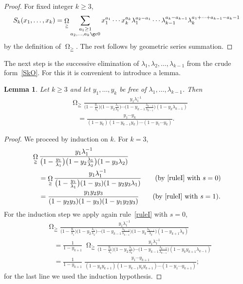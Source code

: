 \documentclass[reqno]{amsart}
\newcommand{\lam}{\lambda}
\DeclareMathOperator*{\Omegaoper}{\Omega}
\newcommand{\Omegaop}{\Omegaoper_{\scriptscriptstyle \geqq}}
\theoremstyle{plain}
\newtheorem{lemma}{Lemma}
\theoremstyle{definition}
\theoremstyle{remark}
\begin{document}
\begin{proof}
   For fixed integer $k \ge 3$,
   \[
     S_k(x_1,\dots,x_k) = \Omegaop \sum_{\substack{a_1 \ge 1 \\ a_2,\dots,a_k \g
e 0}}
     x_1^{a_1} \cdots x_k^{a_k} \lam_1^{a_2-a_1} \cdots
     \lam_{k-1}^{a_k-a_{k-1}} \lam_k^{a_1+\dots+a_{k-1}-a_k-1}
   \]
   by the definition of $\Omegaop$. The rest follows by geometric series
   summation.
\end{proof}

The next step is the successive elimination of $\lam_1, \lam_2, \dots, \lam_{k-1
}$
from the crude form~\eqref{SkO}.
For this it is convenient to introduce a lemma.

\begin{lemma} \label{lem:1}
   Let $k \ge 3$ and let $y_1, \dots, y_k$ be free of
   $\lam_1, \dots, \lam_{k-1}$. Then
   \begin{align*}
      & \Omegaop \frac{y_1 \lam_1^{-1}}
      {\big(1-\frac{y_1}{\lam_1}\big)\big(1-y_2 \frac{\lam_1}{\lam_2}\big)
      \cdots \big(1-y_{k-1} \frac{\lam_{k-2}}{\lam_{k-1}}\big)
      (1-y_k \lam_{k-1})} \\
      & \quad = \frac{y_1 \cdots y_k}{(1-y_k)(1-y_{k-1}y_k)\cdots
      (1-y_1 \cdots y_k)}.
   \end{align*}
\end{lemma}

\begin{proof}
   We proceed by induction on $k$. For $k=3$,
   \begin{align*}
      & \Omegaop \frac{y_1 \lam_1^{-1}}
      {\big(1-\frac{y_1}{\lam_1}\big)\big(1-y_2 \frac{\lam_1}{\lam_2}\big)
      (1-y_3 \lam_2)} \\
      & \quad = \Omegaop \frac{y_1 \lam_1^{-1}}
      {\big(1-\frac{y_1}{\lam_1}\big) (1-y_3) (1-y_2 y_3 \lam_1)}
      \tag{by \eqref{ruleI} with $s=0$}\\
      & \quad = \frac{y_1 y_2 y_3} {(1-y_2 y_3) (1-y_3) (1-y_1 y_2 y_3)}
      \tag{by \eqref{ruleI} with $s=1$}.
   \end{align*}
   For the induction step we apply again rule~\eqref{ruleI} with $s=0$,
   \begin{align*}
      & \Omegaop \frac{y_1 \lam_1^{-1}}
      {\big(1-\frac{y_1}{\lam_1}\big)\big(1-y_2 \frac{\lam_1}{\lam_2}\big)
      \cdots \big(1-y_{k-1} \frac{\lam_{k-2}}{\lam_{k-1}}\big)
      \big(1-y_k \frac{\lam_{k-1}}{\lam_k}\big)
      (1-y_{k+1} \lam_k)} \\
      & \quad = \frac{1}{1-y_{k+1}} \; \Omegaop \frac{y_1 \lam_1^{-1}}
      {\big(1-\frac{y_1}{\lam_1}\big)\big(1-y_2 \frac{\lam_1}{\lam_2}\big)
      \cdots \big(1-y_{k-1} \frac{\lam_{k-2}}{\lam_{k-1}}\big)
      (1-y_k y_{k+1} \lam_{k-1})} \\
      & \quad = \frac{1}{1-y_{k+1}} \; \frac{y_1 \cdots y_{k+1}}
      {(1-y_k y_{k+1}) (1-y_{k-1} y_k y_{k+1}) \cdots (1-y_1 \cdots y_{k+1})};
   \end{align*}
   for the last line we used the induction hypothesis.
\end{proof}
\end{document}
